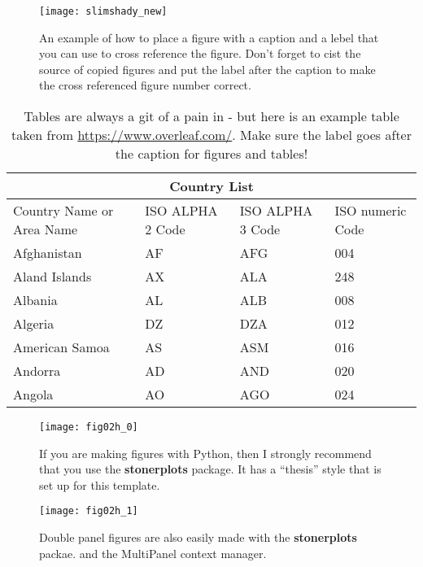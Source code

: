\begin{figure}
	\centering
	\texttt{[image: slimshady\_new]}
	\caption{An example of how to place a figure with a caption and a lebel that you can use to cross reference the figure. Don't forget to cist the source of copied figures \cite{Batley2015} and put the label after the caption to make the cross referenced figure number correct.}
	\label{fig:fig_label}
\end{figure}

\begin{table}
	\begin{center}
\begin{tabular}{ |p{3cm}||p{3cm}|p{3cm}|p{3cm}|  }
	\hline
	\multicolumn{4}{|c|}{Country List} \\
	\hline
	Country Name     or Area Name& ISO ALPHA 2 Code &ISO ALPHA 3 Code&ISO numeric Code\\
	\hline
	Afghanistan   & AF    &AFG&   004\\
	Aland Islands&   AX  & ALA   &248\\
	Albania &AL & ALB&  008\\
	Algeria    &DZ & DZA&  012\\
	American Samoa&   AS  & ASM&016\\
	Andorra& AD  & AND   &020\\
	Angola& AO  & AGO&024\\
	\hline
\end{tabular}
\caption{Tables are always a git of a pain in \LaTeXe - but here is an example table taken from \url{https://www.overleaf.com/}. Make sure the label goes after the caption for figures and tables!}
\label{tab:table_ex}
\end{center}	
\end{table}

\begin{figure}
	\centering
	\texttt{[image: fig02h\_0]}
	\caption{If you are making figures with Python, then I strongly recommend that you
		use the \textbf{stonerplots}\cite{stonerplots} package. It has a ``thesis'' style that is set up
		for this template.}
	\label{fig:fig_label}
\end{figure}

\begin{figure}
	\centering
	\texttt{[image: fig02h\_1]}
	\caption{Double panel figures are also easily made with the \textbf{stonerplots}\cite{stonerplots} packae.
	and the MultiPanel context manager.}
	\label{fig:fig_label}
\end{figure}
